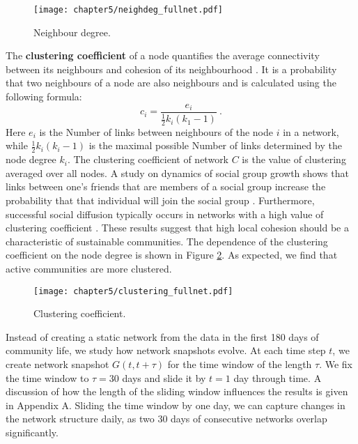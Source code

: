 \begin{figure}[!ht]
	\centering
	\texttt{[image: chapter5/neighdeg\_fullnet.pdf]}
	\caption{Neighbour degree.}
	\label{fig:fullneighdeg}
\end{figure}

The \textbf{clustering coefficient} of a node quantifies the average connectivity between its neighbours and cohesion of its neighbourhood \cite{boccaletti2006complex}. It is a probability that two neighbours of a node are also neighbours and is calculated using the following formula:
\begin{equation}
c_{i}=\frac{e_{i}}{\frac{1}{2}k_{i}(k_{1}-1)} \ .
\label{eq:clust}
\end{equation}
Here $e_{i}$ is the Number of links between neighbours of the node $i$ in a network, while $\frac{1}{2}k_{i}(k_{i}-1)$ is the maximal possible Number of links determined by the node degree $k_{i}$. The clustering coefficient of network $C$ is the value of clustering averaged over all nodes. A study on dynamics of social group growth shows that links between one’s friends that are members of a social group increase the probability that that individual will join the social group \cite{backstrom2006group}. Furthermore, successful social diffusion typically occurs in networks with a high value of clustering coefficient \cite{centola2007cascade}. These results suggest that high local cohesion should be a characteristic of sustainable communities. The dependence of the clustering coefficient on the node degree is shown in Figure \ref{fig:fullclustering}. As expected, we find that active communities are more clustered.

\begin{figure}[h]
	\centering
	\texttt{[image: chapter5/clustering\_fullnet.pdf]}
	\caption{Clustering coefficient.}
	\label{fig:fullclustering}
\end{figure}

Instead of creating a static network from the data in the first 180 days of community life, we study how network snapshots evolve. At each time step $t$, we create network snapshot $G(t, t+\tau)$ for the time window of the length $\tau$. We fix the time window to $\tau=30$ days and slide it by $t=1$ day through time. A discussion of how the length of the sliding window influences the results is given in Appendix A. Sliding the time window by one day, we can capture changes in the network structure daily, as two 30 days of consecutive networks overlap significantly. 

